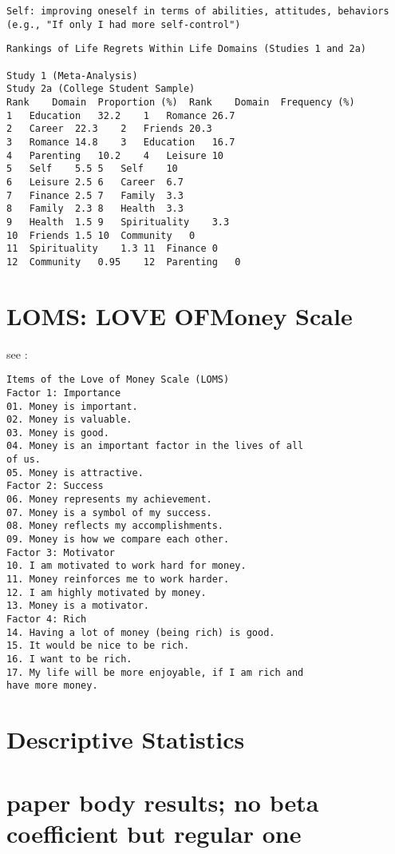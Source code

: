 \documentclass[10pt, letterpaper]{article}
\begin{document}
\begin{spacing}{1.8}
\begin{verbatim}
Self: improving oneself in terms of abilities, attitudes, behaviors (e.g., "If only I had more self-control")
\end{verbatim}


\begin{verbatim}
Rankings of Life Regrets Within Life Domains (Studies 1 and 2a)

Study 1 (Meta-Analysis)
Study 2a (College Student Sample)
Rank	Domain	Proportion (%)	Rank	Domain	Frequency (%)
1	Education	32.2	1	Romance	26.7
2	Career	22.3	2	Friends	20.3
3	Romance	14.8	3	Education	16.7
4	Parenting	10.2	4	Leisure	10
5	Self	5.5	5	Self	10
6	Leisure	2.5	6	Career	6.7
7	Finance	2.5	7	Family	3.3
8	Family	2.3	8	Health	3.3
9	Health	1.5	9	Spirituality	3.3
10	Friends	1.5	10	Community	0
11	Spirituality	1.3	11	Finance	0
12	Community	0.95	12	Parenting	0
\end{verbatim}

\section{LOMS: LOVE OFMoney Scale}

see \citet{tang2003income}:

\begin{verbatim}
Items of the Love of Money Scale (LOMS)
Factor 1: Importance
01. Money is important.
02. Money is valuable.
03. Money is good.
04. Money is an important factor in the lives of all
of us.
05. Money is attractive.
Factor 2: Success
06. Money represents my achievement.
07. Money is a symbol of my success.
08. Money reflects my accomplishments.
09. Money is how we compare each other.
Factor 3: Motivator
10. I am motivated to work hard for money.
11. Money reinforces me to work harder.
12. I am highly motivated by money.
13. Money is a motivator.
Factor 4: Rich
14. Having a lot of money (being rich) is good.
15. It would be nice to be rich.
16. I want to be rich.
17. My life will be more enjoyable, if I am rich and
have more money.
\end{verbatim}

\section{Descriptive Statistics}







\section{paper body results; no beta coefficient but regular one}


\end{spacing}
\end{document}
